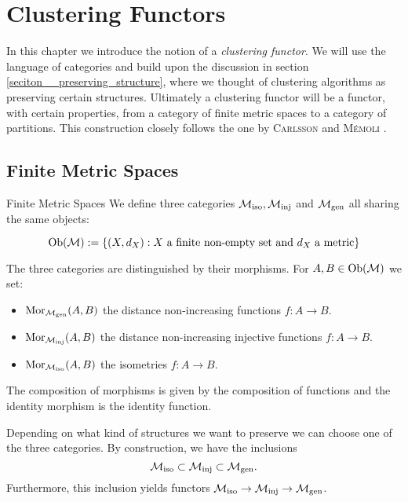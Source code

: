\chapter{Clustering Functors}
\label{chapter__clustering_functor}

In this chapter we introduce the notion of a \emph{clustering functor}.
We will use the language of categories and build upon the discussion in section \ref{seciton__preserving_structure}, where we thought of clustering algorithms as preserving certain structures.
Ultimately a clustering functor will be a functor, with certain properties, from a category of finite metric spaces to a category of partitions.
This construction closely follows the one by \textsc{Carlsson} and \textsc{M\'emoli} \cite{Carlsson2010}.

\section{Finite Metric Spaces}
\label{section__finite_metric_spaces}

\begin{definition}{Finite Metric Spaces}{}
We define three categories ${\mathcal{M}_\mathrm{iso}}, {\mathcal{M}_\mathrm{inj}}$ and ${\mathcal{M}_\mathrm{gen}}$ all sharing the same objects:

\begin{equation*}
\mathrm {Ob}(\mathcal{M}) := \{(X,d_X): \text{$X$ a finite non-empty set and $d_X$ a metric}\}
\end{equation*}

The three categories are distinguished by their morphisms. For $A, B \in \mathrm {Ob}(\mathcal{M})$ we set:
\begin{itemize}
    \item $\mathrm {Mor}_{\mathcal{M}_\mathrm{gen}}(A,B)$ the distance non-increasing functions $f: A \to B$.
    \item $\mathrm {Mor}_{\mathcal{M}_\mathrm{inj}}(A,B)$ the distance non-increasing injective functions $f: A \to B$.
    \item $\mathrm {Mor}_{\mathcal{M}_\mathrm{iso}}(A,B)$ the isometries $f: A \to B$.
\end{itemize}
The composition of morphisms is given by the composition of functions and the identity morphism is the identity function.
\end{definition}

Depending on what kind of structures we want to preserve we can choose one of the three categories.
By construction, we have the inclusions
\begin{equation}
    \label{eq:inclusions_of_finite_metric_space_categories}
    {\mathcal{M}_\mathrm{iso}} \subset {\mathcal{M}_\mathrm{inj}} \subset {\mathcal{M}_\mathrm{gen}}.
\end{equation}
Furthermore, this inclusion yields functors ${\mathcal{M}_\mathrm{iso}} \to {\mathcal{M}_\mathrm{inj}} \to {\mathcal{M}_\mathrm{gen}}$.

